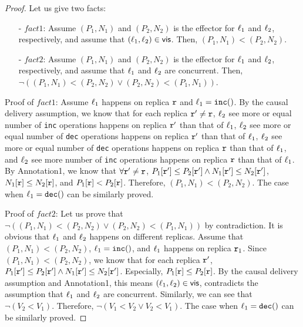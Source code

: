 \begin {proof}

Let us give two facts:

\begin{itemize}
\setlength{\itemsep}{0.5pt}
\item[-] $fact1$: Assume $(P_1,N_1)$ and $(P_2,N_2)$ is the effector for $\alabel_1$ and $\alabel_2$, respectively, and assume that $(\alabel_1,\alabel_2) \in \avisord$. Then, $(P_1,N_1) < (P_2,N_2)$.
\item[-] $fact2$: Assume $(P_1,N_1)$ and $(P_2,N_2)$ is the effector for $\alabel_1$ and $\alabel_2$, respectively, and assume that $\alabel_1$ and $\alabel_2$ are concurrent. Then, $\neg ((P_1,N_1) < (P_2,N_2) \vee (P_2,N_2) < (P_1,N_1))$.
\end{itemize}


\noindent Proof of $fact1$: Assume $\alabel_1$ happens on replica $\arep$ and $\alabel_1 = \alabelshort[{\tt inc}]{}$. By the causal delivery assumption, we know that for each replica $\arep' \neq \arep$, $\alabel_2$ see more or equal number of {\tt inc} operations happens on replica $\arep'$ than that of $\alabel_1$, $\alabel_2$ see more or equal number of {\tt dec} operations happens on replica $\arep'$ than that of $\alabel_1$, $\alabel_2$ see more or equal number of {\tt dec} operations happens on replica $\arep$ than that of $\alabel_1$, and $\alabel_2$ see more number of {\tt inc} operations happens on replica $\arep$ than that of $\alabel_1$. By Annotation1, we know that $\forall \arep' \neq \arep$, $P_1[\arep'] \leq P_2[\arep'] \wedge N_1[\arep'] \leq N_2[\arep']$, $N_1[\arep] \leq N_2[\arep]$, and $P_1[\arep] < P_2[\arep]$. Therefore, $(P_1,N_1) < (P_2,N_2)$. The case when $\alabel_1 = \alabelshort[{\tt dec}]{}$ can be similarly proved.

\noindent Proof of $fact2$: Let us prove that $\neg ((P_1,N_1) < (P_2,N_2) \vee (P_2,N_2) < (P_1,N_1))$ by contradiction. It is obvious that $\alabel_1$ and $\alabel_2$ happens on different replicas. Assume that $(P_1,N_1) < (P_2,N_2)$, $\alabel_1 = \alabelshort[{\tt inc}]{}$, and $\alabel_1$ happens on replica $\arep_1$. Since $(P_1,N_1) < (P_2,N_2)$, we know that for each replica $\arep'$, $P_1[\arep'] \leq P_2[\arep'] \wedge N_1[\arep'] \leq N_2[\arep']$. Especially, $P_1[\arep] \leq P_2[\arep]$. By the causal delivery assumption and Annotation1, this means $(\alabel_1,\alabel_2) \in \avisord$, contradicts the assumption that $\alabel_1$ and $\alabel_2$ are concurrent. Similarly, we can see that $\neg (V_2 < V_1)$. Therefore, $\neg (V_1 < V_2 \vee V_2 < V_1)$.  The case when $\alabel_1 = \alabelshort[{\tt dec}]{}$ can be similarly proved.


\end{proof}
